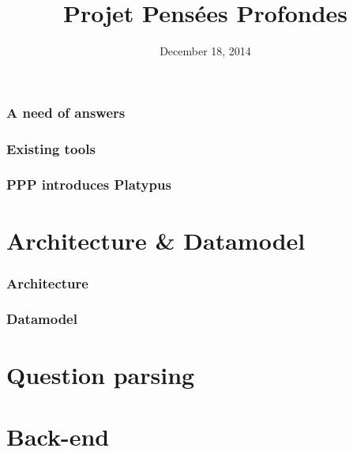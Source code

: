 \documentclass[10pt, compress]{beamer}
\title{Projet Pensées Profondes}
\subtitle{}
\date{December 18, 2014}
\institute{École Normale Supérieure de Lyon}
\begin{document}
\maketitle

\begin{frame}[fragile]
    \frametitle{A need of answers}
\end{frame}

\begin{frame}[fragile]
    \frametitle{Existing tools}
\end{frame}

\begin{frame}[fragile]
    \frametitle{PPP introduces Platypus}
\end{frame}

\section{Architecture \& Datamodel}
\begin{frame}[fragile]
    \frametitle{Architecture}
    \begin{figure}
        \resizebox{.9\linewidth}{!}{
            
        }
    \end{figure}
\end{frame}

\begin{frame}[fragile]
    \frametitle{Datamodel}
\end{frame}

\section{Question parsing}

\section{Back-end}

\end{document}
